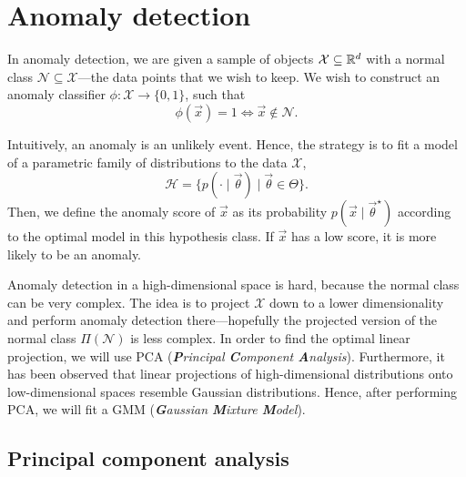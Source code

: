 \section{Anomaly detection}

In anomaly detection, we are given a sample of objects $\mathcal{X} \subseteq \mathbb{R}^d$ with a normal
class $\mathcal{N} \subseteq \mathcal{X}$---the data points that we wish to keep. We wish to
construct an anomaly classifier $\phi: \mathcal{X} \to \{ 0,1 \}$, such that \[
    \phi(\vec{x}) = 1 \iff \vec{x} \not\in \mathcal{N}.
\]

Intuitively, an anomaly is an unlikely event. Hence, the strategy is to fit a model of a parametric
family of distributions to the data $\mathcal{X}$, \[
    \mathcal{H} = \{ p(\cdot \mid \vec{\theta}) \mid \vec{\theta} \in \Theta \}.
\]
Then, we define the anomaly score of $\vec{x}$ as its probability $p(\vec{x} \mid
    \vec{\theta}^\star)$ according to the optimal model in this hypothesis class. If $\vec{x}$ has a
low score, it is more likely to be an anomaly.

Anomaly detection in a high-dimensional space is hard, because the normal class can be very
complex. The idea is to project $\mathcal{X}$ down to a lower dimensionality and perform anomaly
detection there---hopefully the projected version of the normal class $\Pi(\mathcal{N})$ is less
complex. In order to find the optimal linear projection, we will use PCA
(\textit{\textbf{P}rincipal \textbf{C}omponent \textbf{A}nalysis}). Furthermore, it has been
observed that linear projections of high-dimensional distributions onto low-dimensional spaces
resemble Gaussian distributions. Hence, after performing PCA, we will fit a GMM
(\textit{\textbf{G}aussian \textbf{M}ixture \textbf{M}odel}).

\subsection{Principal component analysis}

